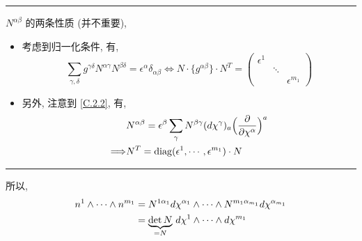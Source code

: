 \begin{itemize}
\begin{itemize}
\begin{tcolorbox}[title=proof:]
			\noindent\rule[0.5ex]{\linewidth}{0.5pt} %
			
			$N^{\alpha \beta}$ 的两条性质 (并不重要),
			\begin{itemize}
				\item 考虑到归一化条件, 有,
				\begin{equation}
					\sum_{\gamma, \delta} g^{\gamma \delta} N^{\alpha \gamma} N^{\beta \delta} = \epsilon^\alpha \delta_{\alpha \beta} \iff N \cdot \{g^{\alpha \beta}\} \cdot N^T = \begin{pmatrix}
						\epsilon^1 & & \\
						& \ddots & \\
						& & \epsilon^{m_1}
					\end{pmatrix}
				\end{equation}
				
				\item 另外, 注意到 \eqref{C.2.2}, 有,
				\begin{align}
					& N^{\alpha \beta} = \epsilon^\beta \sum_\gamma N^{\beta \gamma} (d\chi^\gamma)_a \Big( \frac{\partial}{\partial \chi^\alpha} \Big)^a \notag \\
					\Longrightarrow & N^T = \mathrm{diag}(\epsilon^1, \cdots, \epsilon^{m_1}) \cdot N
				\end{align}
			\end{itemize}
			
			\noindent\rule[0.5ex]{\linewidth}{0.5pt} %
			
			所以,
			\begin{align}
				n^1 \wedge \cdots \wedge n^{m_1} &= N^{1 \alpha_1} d\chi^{\alpha_1} \wedge \cdots \wedge N^{m_1 \alpha_{m_1}} d\chi^{\alpha_{m_1}} \notag \\
				&= \underbrace{\det N}_{= N} \, d\chi^1 \wedge \cdots \wedge d\chi^{m_1}
			\end{align}
		\end{tcolorbox}
	\end{itemize}
\end{itemize}
